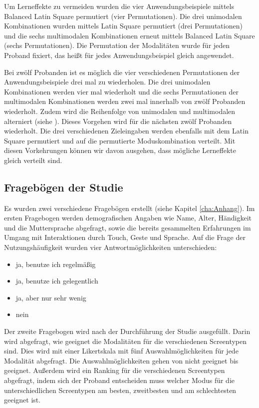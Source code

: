 Um Lerneffekte zu vermeiden wurden die vier Anwendungsbeispiele mittels Balanced Latin Square permutiert (vier Permutationen).
Die drei unimodalen Kombinationen wurden mittels Latin Square permutiert (drei Permutationen) und die sechs multimodalen Kombinationen erneut mittels Balanced Latin Square (sechs Permutationen).
Die Permutation der Modalitäten wurde für jeden Proband fixiert, das heißt für jedes Anwendungsbeispiel gleich angewendet. 

Bei zwölf Probanden ist es möglich die vier verschiedenen Permutationen der Anwendungsbeispiele drei mal zu wiederholen. 
Die drei unimodalen Kombinationen werden vier mal wiederholt und die sechs Permutationen der multimodalen Kombinationen werden zwei mal innerhalb von zwölf Probanden wiederholt. 
Zudem wird die Reihenfolge von unimodalen und multimodalen alterniert (siehe ). 
Dieses Vorgehen wird für die nächsten zwölf Probanden wiederholt. 
Die drei verschiedenen Zieleingaben werden ebenfalls mit dem Latin Square permutiert und auf die permutierte Moduskombination verteilt. 
Mit diesen Vorkehrungen können wir davon ausgehen, dass mögliche Lerneffekte gleich verteilt sind.

\subsection[Fragebögen]{Fragebögen der Studie}
Es wurden zwei verschiedene Fragebögen erstellt (siehe Kapitel \ref{cha:Anhang}). 
Im ersten Fragebogen werden demografischen Angaben wie Name, Alter, Händigkeit und die Muttersprache abgefragt, sowie die bereits gesammelten Erfahrungen im Umgang mit Interaktionen durch Touch, Geste und Sprache. 
Auf die Frage der Nutzungshäufigkeit wurden vier Antwortmöglichkeiten unterschieden:
\begin{itemize}
	\item ja, benutze ich regelmäßig 
	\item ja, benutze ich gelegentlich
	\item ja, aber nur sehr wenig
	\item nein
\end{itemize}



Der zweite Fragebogen wird nach der Durchführung der Studie ausgefüllt. 
Darin wird abgefragt, wie geeignet die Modalitäten für die verschiedenen Screentypen sind. 
Dies wird mit einer Likertskala mit fünf Auswahlmöglichkeiten für jede Modalität abgefragt.  
Die Auswahlmöglichkeiten gehen von nicht geeignet bis geeignet. 
Außerdem wird ein Ranking für die verschiedenen Screentypen abgefragt, indem sich der Proband entscheiden muss welcher Modus für die unterschiedlichen Screentypen am besten, zweitbesten und am schlechtesten geeignet ist.  

